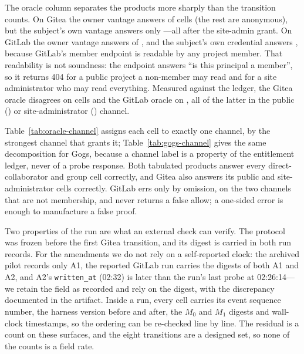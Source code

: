 The oracle column separates the products more sharply than the transition counts. On Gitea
the owner vantage answers \TmpOracleReadable{} of \TmpCells{} cells (the rest are anonymous),
but the subject's own vantage answers only \TmpOracleSelfReadable{}---all after the
site-admin grant. On GitLab the owner vantage answers \TmpGOracleReadable{} of \TmpGCells{},
and the subject's own credential answers \TmpGOracleSelfReadable{}, because GitLab's member
endpoint is readable by any project member. That readability is not soundness: the endpoint
answers ``is this principal a member'', so it returns 404 for a public project a non-member
may read and for a site administrator who may read everything. Measured against the ledger,
the Gitea oracle disagrees on \TmpOracleDisagree{} cells and the GitLab oracle on
\TmpGOracleDisagree{}, all of the latter in the public (\TmpGOracleDisagreePublic{}) or
site-administrator (\TmpGOracleDisagreeAdmin{}) channel.

Table~\ref{tab:oracle-channel} assigns each cell to exactly one channel, by the strongest
channel that grants it; Table~\ref{tab:gogs-channel} gives the same decomposition for Gogs,
because a channel label is a property of the entitlement ledger, never of a probe response.
Both tabulated products answer every direct-collaborator and group cell correctly, and Gitea
also answers its public and site-administrator cells correctly. GitLab errs only by omission,
on the two channels that are not membership, and never returns a false allow; a one-sided
error is enough to manufacture a false proof.



Two properties of the run are what an external check can verify. The protocol was frozen
before the first Gitea transition, and its digest is carried in both run records. For the
amendments we do not rely on a self-reported clock: the archived pilot records only A1, the
reported GitLab run carries the digests of both A1 and A2, and A2's \texttt{written\_at}
(02:32) is later than the run's last probe at 02:26:14---we retain the field as recorded and
rely on the digest, with the discrepancy documented in the artifact. Inside a run, every cell
carries its event sequence number, the harness version before and after, the $M_0$ and $M_1$
digests and wall-clock timestamps, so the ordering can be re-checked line by line. The
residual \TmpBothStillMiss{} is a count on these surfaces, and the eight transitions are a
designed set, so none of the counts is a field rate.

